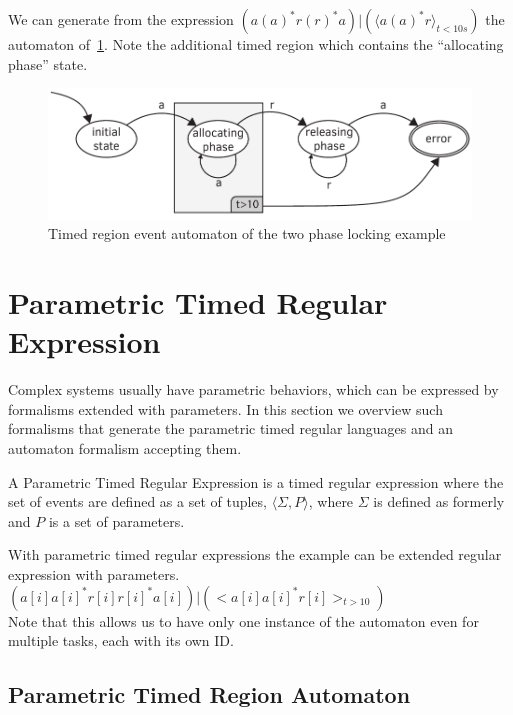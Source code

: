 			
			We can generate from the expression $(a (a)^\ast r (r)^\ast a)|( \langle a (a)^\ast r \rangle_{t < 10 s})$ the automaton of~\cref{fig:cep:trea}. Note the additional timed region which contains the ``allocating phase'' state.
			
			\begin{figure}[h]
			\centering
			\includegraphics[width=0.7\linewidth]{figures/chapter_4/allocating_timed}
			\caption{Timed region event automaton of the two phase locking example \redraw}
			\label{fig:cep:trea}
			\end{figure}


		
	\section{Parametric Timed Regular Expression}

		Complex systems usually have parametric behaviors, which can be expressed by formalisms extended with parameters. In this section we overview such formalisms that generate the parametric timed regular languages and an automaton formalism accepting them.

		


		\begin{dfn}
		A Parametric Timed Regular Expression is a timed regular expression where the set of events are defined as a set of tuples, $\langle \Sigma, P \rangle$,
		where $\Sigma$ is defined as formerly and $P$ is a set of parameters.
		\end{dfn}
		
		


		With parametric timed regular expressions the example can be extended regular expression with parameters. \\
		$(a[i] a[i]^\ast  r[i] r[i]^\ast a[i]) | (<a[i] a[i]^\ast r[i]>_{t > 10} )$ \\
		Note that this allows us to have only one instance of the automaton even for multiple tasks, each with its own ID.
	
		\subsection{Parametric Timed Region Automaton}
			
